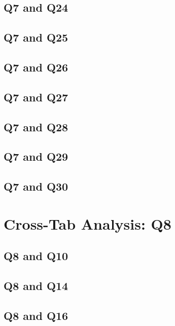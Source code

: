 \documentclass{report}
\begin{document}
\clearpage
\section{Q7 and Q24}


\clearpage
\section{Q7 and Q25}


\clearpage
\section{Q7 and Q26}


\clearpage
\section{Q7 and Q27}


\clearpage
\section{Q7 and Q28}


\clearpage
\section{Q7 and Q29}


\clearpage
\section{Q7 and Q30}


\chapter{Cross-Tab Analysis: Q8}
\section{Q8 and Q10}


\clearpage
\section{Q8 and Q14}


\clearpage
\section{Q8 and Q16}

\end{document}

